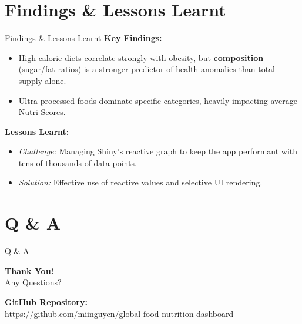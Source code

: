 \documentclass[aspectratio=169]{beamer}
\begin{document}
\section{Findings \& Lessons Learnt}
\begin{frame}{Findings \& Lessons Learnt}
    \textbf{Key Findings:}
    \begin{itemize}
        \item High-calorie diets correlate strongly with obesity, but \textbf{composition} (sugar/fat ratios) is a stronger predictor of health anomalies than total supply alone.
        \item Ultra-processed foods dominate specific categories, heavily impacting average Nutri-Scores.
    \end{itemize}
    
    \vspace{0.3cm}
    \textbf{Lessons Learnt:}
    \begin{itemize}
        \item \textit{Challenge:} Managing Shiny's reactive graph to keep the app performant with tens of thousands of data points.
        \item \textit{Solution:} Effective use of reactive values and selective UI rendering.
    \end{itemize}
\end{frame}

\section{Q \& A}
\begin{frame}{Q \& A}
    \begin{center}
        \Huge \textbf{Thank You!} \\
        \vspace{1cm}
        \large Any Questions?
        
        \vspace{1cm}
        \normalsize \textbf{GitHub Repository:} \\
        \url{https://github.com/miinguyen/global-food-nutrition-dashboard}
    \end{center}
\end{frame}
\end{document}
